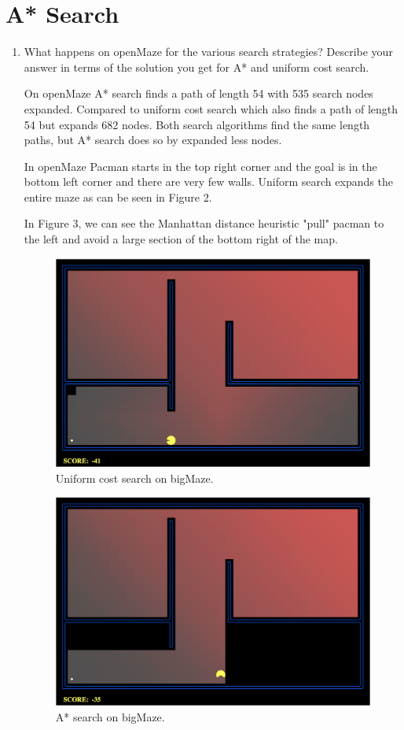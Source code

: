 \documentclass[fleqn]{hermans-hw}
\begin{document}
\section{A* Search}
\begin{enumerate}
	\item What happens on openMaze for the various search strategies? Describe your answer in terms of the solution you get for A* and uniform cost search.
	
	On openMaze A* search finds a path of length 54 with 535 search nodes expanded. Compared to uniform cost search which also finds a path of length 54 but expands 682 nodes. Both search algorithms find the same length paths, but A* search does so by expanded less nodes.
	
	In openMaze Pacman starts in the top right corner and the goal is in the bottom left corner and there are very few walls. Uniform search expands the entire maze as can be seen in Figure 2.
	
	In Figure 3, we can see the Manhattan distance heuristic "pull" pacman to the left and avoid a large section of the bottom right of the map.
	
		\begin{figure}[H]
  \centerline{\includegraphics[width=0.5\linewidth]{img_3.png}}
  \caption{Uniform cost search on bigMaze.}
\end{figure}

	\begin{figure}[H]
  \centerline{\includegraphics[width=0.5\linewidth]{img_2.png}}
  \caption{A* search on bigMaze.}
\end{figure}
	
\end{enumerate}
\end{document}
